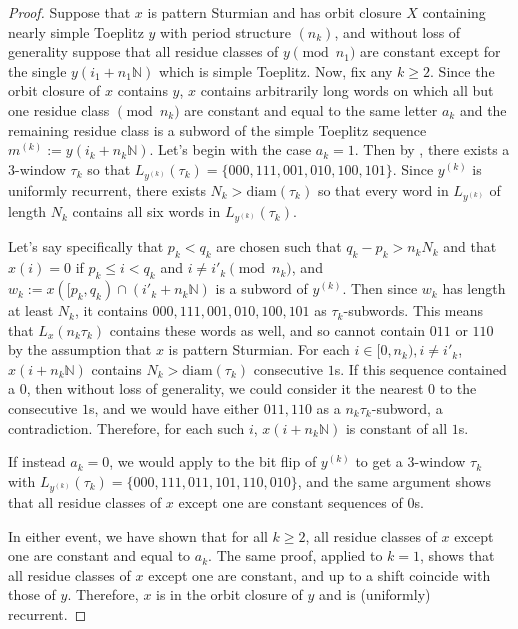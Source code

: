 \documentclass[11pt,reqno]{amsart}
\theoremstyle{definition}
\theoremstyle{plain}
\begin{document}
\begin{proof}
Suppose that $x$ is pattern Sturmian and has orbit closure $X$ containing nearly simple Toeplitz $y$ with period structure $(n_k)$, and without loss of generality suppose that all residue classes of 
$y \pmod{n_1}$ are constant except for the single $y(i_1 + n_1 \mathbb{N})$ which is simple Toeplitz. Now, fix any $k \geq 2$. Since the orbit closure of $x$ contains $y$, $x$ contains arbitrarily long words on which all but one residue class $\pmod{n_k}$ are constant and equal to the same letter $a_k$ and the remaining residue class is a subword of the simple Toeplitz sequence $m^{(k)} := y(i_k + n_k \mathbb{N})$. Let's begin with the case 
$a_k = 1$. Then by , there exists a $3$-window $\tau_k$ so that $L_{y^{(k)}}(\tau_k) = 
\{000, 111, 001, 010, 100, 101\}$. Since $y^{(k)}$ is uniformly recurrent, there exists $N_k > \textrm{diam}(\tau_k)$ so that every word in $L_{y^{(k)}}$ of length $N_k$ contains all six words in $L_{y^{(k)}}(\tau_k)$. 

Let's say specifically that $p_k < q_k$ are chosen such that $q_k - p_k > n_k N_k$ and that
$x(i) = 0$ if $p_k \leq i < q_k$ and $i \neq i'_k \pmod{n_k}$, and $w_k := x([p_k, q_k) \cap (i'_k + n_k \mathbb{N})$ is a subword of $y^{(k)}$. Then since $w_k$ has length at least $N_k$, it contains $000, 111, 001, 010, 100, 101$ as $\tau_k$-subwords. This means that $L_x(n_k \tau_k)$ contains these words as well, and so cannot contain $011$ or $110$ by the assumption that $x$ is pattern Sturmian. For each $i \in [0, n_k), i \neq i'_k$, $x(i + n_k \mathbb{N})$ contains $N_k > \textrm{diam}(\tau_k)$ consecutive $1$s. If this sequence contained a $0$, then without loss of generality, we could consider it the nearest $0$ to the consecutive $1$s, and we would have either $011, 110$ as a $n_k \tau_k$-subword, a contradiction. Therefore, for each such $i$, $x(i + n_k \mathbb{N})$ is constant of all $1$s. 

If instead $a_k = 0$, we would apply  to the bit flip of $y^{(k)}$ to get a $3$-window $\tau_k$ with $L_{y^{(k)}}(\tau_k) = \{000, 111, 011, 101, 110, 010\}$, and the same argument shows that all residue classes of $x$ except one are constant sequences of $0$s. 

In either event, we have shown that for all $k \geq 2$, all residue classes of $x$ except one are constant and equal to 
$a_k$. The same proof, applied to $k = 1$, shows that all residue classes of $x$ except one are constant, and up to a shift coincide with those of $y$. Therefore, $x$ is in the orbit closure of $y$ and is (uniformly) recurrent.
    
\end{proof}
\end{document}

